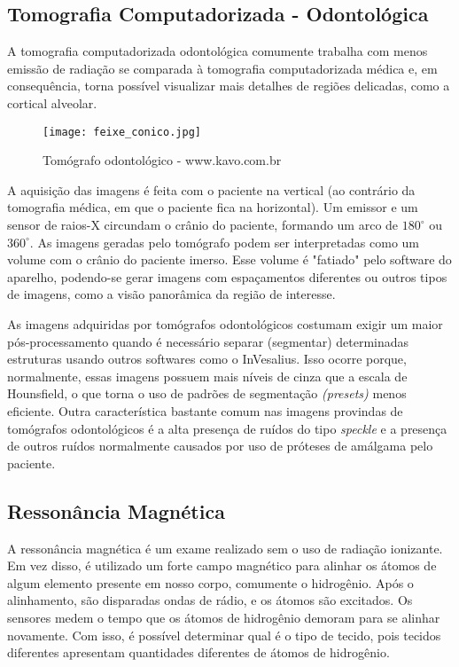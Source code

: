\subsection{Tomografia Computadorizada - Odontológica}

A tomografia computadorizada odontológica comumente trabalha com menos emissão
de radiação se comparada à tomografia computadorizada médica e, em consequência,
torna possível visualizar mais detalhes de regiões delicadas, como a cortical alveolar.

\begin{figure}[!htb]
\centering
\texttt{[image: feixe\_conico.jpg]}
\caption{Tomógrafo odontológico - www.kavo.com.br}
\end{figure}

A aquisição das imagens é feita com o paciente na vertical (ao contrário da tomografia médica,
em que o paciente fica na horizontal). Um emissor e um sensor de raios-X circundam o crânio
do paciente, formando um arco de $180^\circ$ ou $360^\circ$. As imagens geradas pelo tomógrafo
podem ser interpretadas como um volume com o crânio do paciente imerso. Esse volume é "fatiado"
pelo software do aparelho, podendo-se gerar imagens com espaçamentos diferentes ou outros
tipos de imagens, como a visão panorâmica da região de interesse.

As imagens adquiridas por tomógrafos odontológicos costumam exigir um maior pós-processamento
quando é necessário separar (segmentar) determinadas estruturas usando outros softwares como
o InVesalius. Isso ocorre porque, normalmente, essas imagens possuem mais níveis de cinza que
a escala de Hounsfield, o que torna o uso de padrões de segmentação \textit{(presets)} menos
eficiente. Outra característica bastante comum nas imagens provindas de tomógrafos
odontológicos é a alta presença de ruídos do tipo \textit{speckle} e a presença de outros
ruídos normalmente causados por uso de próteses de amálgama pelo paciente.


\subsection{Ressonância Magnética}

A ressonância magnética é um exame realizado sem o uso de radiação ionizante. Em vez disso,
é utilizado um forte campo magnético para alinhar os átomos de algum elemento presente em
nosso corpo, comumente o hidrogênio. Após o alinhamento, são disparadas ondas de rádio, e os
átomos são excitados. Os sensores medem o tempo que os átomos de hidrogênio demoram para se
alinhar novamente. Com isso, é possível determinar qual é o tipo de tecido, pois tecidos
diferentes apresentam quantidades diferentes de átomos de hidrogênio.

